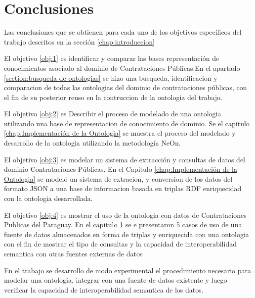 \section{Conclusiones}
\label{chap:analisis}
Las conclusiones que se obtienen para cada uno de los objetivos específicos del trabajo descritos en la sección \ref{chap:introduccion} 

El objetivo \ref{obj:1} es identificar y comparar las bases representación de conocimientos asociado al dominio de Contrataciones Públicas.En el apartado \ref{section:busqueda de ontologias} se hizo una busqueda, identificacion y comparacion de todas las ontologias del dominio de contrataciones públicas, con el fin de su posterior reuso en la contruccion de la ontologia del trabajo.

El objetivo \ref{obj:2} es Describir el proceso de modelado de una ontologia utilizando una base de representacion de conocimiento de dominio. Se el capitulo \ref{chap:Implementación de la Ontologia} se muestra el proceso del modelado y desarrollo de la ontologia utilizando la metodología NeOn.

El objetivo \ref{obj:3} es modelar un sistema de extracción y consultas de datos del dominio Contrataciones Públicas. En el Capitulo \ref{chap:Implementación de la Ontologia} se modeló un sistema de extracion, y conversion de los datos del formato JSON a una base de informacion basada en triplas RDF enriquecidad con la ontologia desarrollada. 

El objetivo \ref{obj:4} es mostrar el uso de la ontologia con datos de Contrataciones Publicas del Paraguay. En el capitulo \ref{chap:analisis} se e presentaron 5 casos de uso de una fuente de datos almacenados en forma de triplas y enriquecida con una ontologia con el fin de mostrar el tipo de consultas y la capacidad de interoperabilidad semantica con otras fuentes externas de datos

En el trabajo se desarrollo de modo experimental el procedimiento necesario para modelar una ontologia, integrar con una fuente de datos existente y luego verificar la capacidad de interoperabilidad semantica de los datos. 

